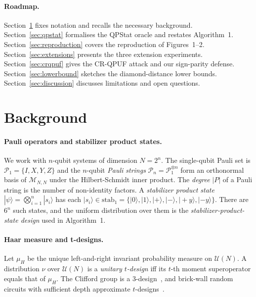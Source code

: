 \documentclass[11pt]{article}
\newcommand{\stab}{\mathrm{stab}}
\begin{document}
\paragraph{Roadmap.}
Section~\ref{sec:background} fixes notation and recalls the necessary
background. Section~\ref{sec:qpstat} formalises the QPStat oracle and
restates Algorithm~1. Section~\ref{sec:reproduction} covers the
reproduction of Figures~1--2. Section~\ref{sec:extensions} presents the
three extension experiments. Section~\ref{sec:crqpuf} gives the
CR-QPUF attack and our sign-parity defense.
Section~\ref{sec:lowerbound} sketches the
diamond-distance lower bounds. Section~\ref{sec:discussion} discusses
limitations and open questions.

\section{Background}\label{sec:background}

\paragraph{Pauli operators and stabilizer product states.}
We work with $n$-qubit systems of dimension $N = 2^n$. The single-qubit
Pauli set is $\mathcal{P}_1 = \{I, X, Y, Z\}$ and the $n$-qubit
\emph{Pauli strings} $\mathcal{P}_n = \mathcal{P}_1^{\otimes n}$ form an
orthonormal basis of $\mathcal{M}_{N,N}$ under the Hilbert-Schmidt inner
product. The \emph{degree} $|P|$ of a Pauli string is the number of
non-identity factors. A \emph{stabilizer product state}
$|\psi\rangle = \bigotimes_{i=1}^n |s_i\rangle$ has each
$|s_i\rangle \in \stab_1 = \{|0\rangle, |1\rangle, |+\rangle, |-\rangle,
|+y\rangle, |-y\rangle\}$. There are $6^n$ such states, and the uniform
distribution over them is the \emph{stabilizer-product-state design}
used in Algorithm~1.

\paragraph{Haar measure and t-designs.}
Let $\mu_H$ be the unique left-and-right invariant probability measure
on $\mathcal{U}(N)$. A distribution $\nu$ over $\mathcal{U}(N)$ is a
\emph{unitary $t$-design} iff its $t$-th moment superoperator equals
that of $\mu_H$. The Clifford group is a 3-design~\cite{webb2016cliffordtdesign},
and brick-wall random circuits with sufficient depth approximate
$t$-designs~\cite{harrowmehraban2018random}.
\end{document}

